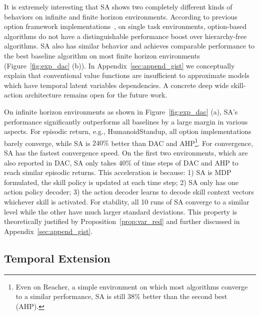 It is extremely interesting that SA shows two completely
different kinds of behaviors on infinite and finite horizon
environments. According to previous option framework
implementations~\cite{klissarov2017learnings,smith2018inference,harb2018waiting,zhang2019dac},
on single task environments, option-based algorithms do not have
a distinguishable performance boost over hierarchy-free
algorithms. SA also has similar behavior and achieves comparable
performance to the best baseline algorithm on most finite horizon
environments (Figure~\ref{fig:exp_dac} (b)). In
Appendix~\ref{sec:append_gist} we conceptually explain that
conventional value functions are insufficient to approximate
models which have temporal latent variables dependencies. A
concrete deep wide skill-action architecture remains open for the
future work.

On infinite horizon environments as shown in
Figure~\ref{fig:exp_dac} (a), SA's performance significantly
outperforms all baselines by a large margin in various aspects.
For episodic return, e.g., HumanoidStandup, all option
implementations barely converge, while SA is $240\%$ better than
DAC and AHP\footnote{Even on Reacher, a simple environment on
  which most algorithms converge to a similar performance, SA is
  still $38\%$ better than the second best (AHP).}. For
convergence, SA has the fastest convergence speed. On the first
two environments, which are also reported in DAC, SA only takes
$40\%$ of time steps of DAC and AHP to reach similar episodic
returns. This acceleration is because: 1) SA is MDP formulated,
the skill policy is updated at each time step; 2) SA only has one
action policy decoder; 3) the action decoder learns to decode
skill context vectors whichever skill is activated. For
stability, all 10 runs of SA converge to a similar level while
the other have much larger standard deviations. This property is
theoretically justified by Proposition~\ref{prop:var_red} and
further discussed in Appendix~\ref{sec:append_gist}.

\vspace{-2mm}
\subsection{Temporal Extension}
\label{sec:exp_ext}

